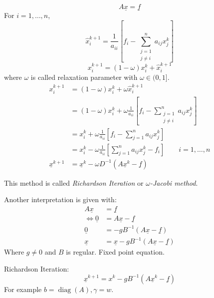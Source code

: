 \documentclass{article}
\DeclareMathOperator{\diag}{diag}
\begin{document}
\[ A \underline{x} = \underline{f} \]
For $i = 1,\ldots,n$,
\[ \hat x_i^{k+1} = \frac{1}{a_{ii}} \left[ f_i - \sum_{\substack{j=1 \\ j \neq i}}^n a_{ij} x_j^k \right] \]
\[ x_i^{k+1} = (1 - \omega) x_i^k + \hat x_i^{k+1} \]
where $\omega$ is called relaxation parameter with $\omega \in (0,1]$.
\begin{align*}
  x_i^{k+1} &= (1 - \omega) x_i^k + \omega \hat x_i^{k+1} \\
    &= (1 - \omega) x_i^k + \omega \frac{1}{a_{ii}} \left[f_i - \sum_{\substack{j=1 \\ j \neq i}}^n a_{ij} x_j^k\right] \\
    &= x_i^k + \omega \frac{1}{a_{ii}} \left[ f_i - \sum_{j=1}^n a_{ij} x_j^k \right] \\
    &= x_i^k - \omega \frac{1}{a_{ii}} \left[\sum_{j=1}^{n} a_{ij} x_j^k - f_i\right] \qquad i = 1,\ldots,n \\
  \underline{x}^{k+1} &= \underline{x}^k - \omega D^{-1} (A \underline{x}^k - \underline{f})
\end{align*}

This method is called \emph{Richardson Iteration} or \emph{$\omega$-Jacobi method}.

Another interpretation is given with:
\begin{align*}
  A \underline{x} &= \underline{f} \\
  \iff \underline{0} &= A \underline{x} - \underline{f} \\
  \underline{0} &= -gB^{-1} (A \underline{x} - \underline{f}) \\
  \underline{x} &= \underline{x} - gB^{-1} (A \underline{x} - \underline{f})
\end{align*}
Where $g \neq 0$ and $B$ is regular. Fixed point equation.

Richardson Iteration:
\[ \underline{x}^{k+1} = x^k - gB^{-1} (A \underline{x}^k - \underline{f}) \]
For example $b = \diag(A), \gamma = w$.
\end{document}

